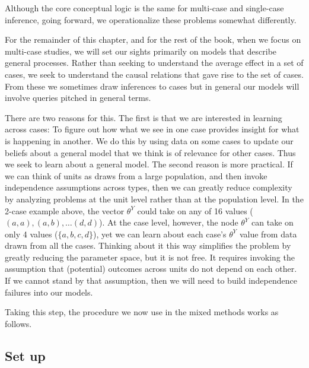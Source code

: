 \documentclass[
  12pt,
]{book}
\begin{document}
Although the core conceptual logic is the same for multi-case and single-case inference, going forward, we operationalize these problems somewhat differently.

For the remainder of this chapter, and for the rest of the book, when we focus on multi-case studies, we will set our sights primarily on models that describe general processes. Rather than seeking to understand the average effect in a set of cases, we seek to understand the causal relations that gave rise to the set of cases. From these we sometimes draw inferences to cases but in general our models will involve queries pitched in general terms.

There are two reasons for this. The first is that we are interested in learning across cases: To figure out how what we see in one case provides insight for what is happening in another. We do this by using data on some cases to update our beliefs about a general model that we think is of relevance for other cases. Thus we seek to learn about a general model. The second reason is more practical. If we can think of units as draws from a large population, and then invoke independence assumptions across types, then we can greatly reduce complexity by analyzing problems at the unit level rather than at the population level. In the 2-case example above, the vector \(\theta^Y\) could take on any of 16 values (\((a,a), (a,b),\dots (d,d)\)). At the case level, however, the node \(\theta^Y\) can take on only 4 values (\(\{a,b,c,d\}\)), yet we can learn about each case's \(\theta^Y\) value from data drawn from all the cases. Thinking about it this way simplifies the problem by greatly reducing the parameter space, but it is not free. It requires invoking the assumption that (potential) outcomes across units do not depend on each other. If we cannot stand by that assumption, then we will need to build independence failures into our models.

Taking this step, the procedure we now use in the mixed methods works as follows.

\hypertarget{set-up}{%
\subsection{Set up}\label{set-up}}
\end{document}
